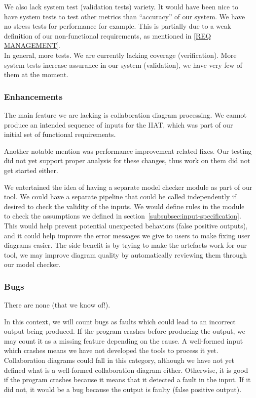 We also lack system test (validation tests) variety.
It would have been nice to have system tests to test other metrics than ``accuracy'' of our system.
We have no stress tests for performance for example.
This is partially due to a weak definition of our non-functional requirements, as mentioned in \ref{REQ MANAGEMENT}. \\

In general, more tests.
We are currently lacking coverage (verification).
More system tests increase assurance in our system (validation), we have very few of them at the moment.

\subsubsection{Enhancements}
The main feature we are lacking is collaboration diagram processing.
We cannot produce an intended sequence of inputs for the IIAT, which was part of our initial set of functional requirements.

Another notable mention was performance improvement related fixes.
Our testing did not yet support proper analysis for these changes, thus work on them did not get started either.

We entertained the idea of having a separate model checker module as part of our tool.
We could have a separate pipeline that could be called independently if desired to check the validity of the inputs.
We would define rules in the module to check the assumptions we defined in section~\ref{subsubsec:input-specification}.
This would help prevent potential unexpected behaviors (false positive outputs),
and it could help improve the error messages we give to users to make fixing user diagrams easier.
The side benefit is by trying to make the artefacts work for our tool,
we may improve diagram quality by automatically reviewing them through our model checker.


\subsubsection{Bugs}
There are none (that we know of!).

In this context, we will count bugs as faults which could lead to an incorrect output being produced.
If the program crashes before producing the output, we may count it as a missing feature depending on the cause.
A well-formed input which crashes means we have not developed the tools to process it yet.
Collaboration diagrams could fall in this category, although we have not yet defined what is a well-formed collaboration diagram either.
Otherwise, it is good if the program crashes because it means that it detected a fault in the input.
If it did not, it would be a bug because the output is faulty (false positive output).

